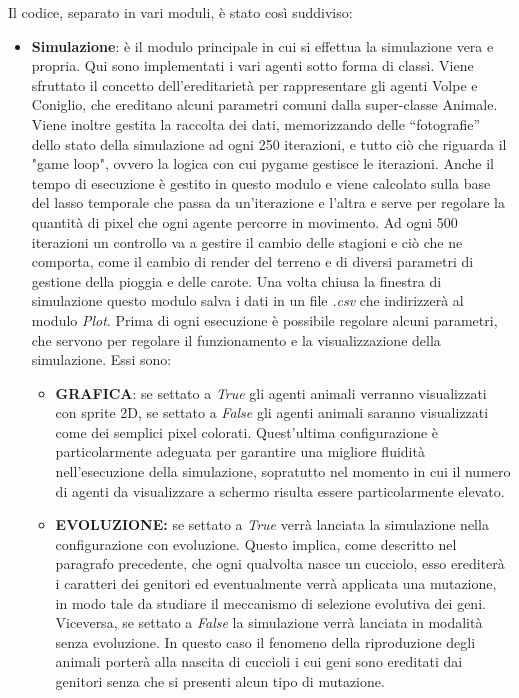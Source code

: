 \documentclass[11pt]{article}
\begin{document}
Il codice, separato in vari moduli, è stato così suddiviso: \begin{itemize}
    \item \textbf{Simulazione}: è il modulo principale in cui si effettua la simulazione vera e propria. Qui sono implementati i vari agenti sotto forma di classi. Viene sfruttato il concetto dell'ereditarietà per rappresentare gli agenti Volpe e Coniglio, che ereditano alcuni parametri comuni dalla super-classe Animale. Viene inoltre gestita la raccolta dei dati, memorizzando delle “fotografie” dello stato della simulazione ad ogni 250 iterazioni, e tutto ciò che riguarda il "game loop", ovvero la logica con cui pygame gestisce le iterazioni. Anche il tempo di esecuzione è gestito in questo modulo e viene calcolato sulla base del lasso temporale che passa da un'iterazione e l'altra e serve per regolare la quantità di pixel che ogni agente percorre in movimento. Ad ogni 500 iterazioni un controllo va a gestire il cambio delle stagioni e ciò che ne comporta, come il cambio di render del terreno e di diversi parametri di gestione della pioggia e delle carote. Una volta chiusa la finestra di simulazione questo modulo salva i dati in un file \textit{.csv} che indirizzerà al modulo \textit{Plot}. Prima di ogni esecuzione è possibile regolare alcuni parametri, che servono per regolare il funzionamento e la visualizzazione della simulazione. Essi sono:
    \begin{itemize}
        \item \textbf{GRAFICA}: se settato a \textit{True} gli agenti animali verranno visualizzati con sprite 2D, se settato a \textit{False} gli agenti animali saranno visualizzati come dei semplici pixel colorati. Quest'ultima configurazione è particolarmente adeguata per garantire una migliore fluidità nell'esecuzione della simulazione, sopratutto nel momento in cui il numero di agenti da visualizzare a schermo risulta essere particolarmente elevato.
        \item \textbf{EVOLUZIONE:} se settato a \textit{True} verrà lanciata la simulazione nella configurazione con evoluzione. Questo implica, come descritto nel paragrafo precedente, che ogni qualvolta nasce un cucciolo, esso erediterà i caratteri dei genitori ed eventualmente verrà applicata una mutazione, in modo tale da studiare il meccanismo di selezione evolutiva dei geni. Viceversa, se settato a \textit{False} la simulazione verrà lanciata in modalità senza evoluzione. In questo caso il fenomeno della riproduzione degli animali porterà alla nascita di cuccioli i cui geni sono ereditati dai genitori senza che si presenti alcun tipo di mutazione. 

\end{itemize}
\end{itemize}
\end{document}
